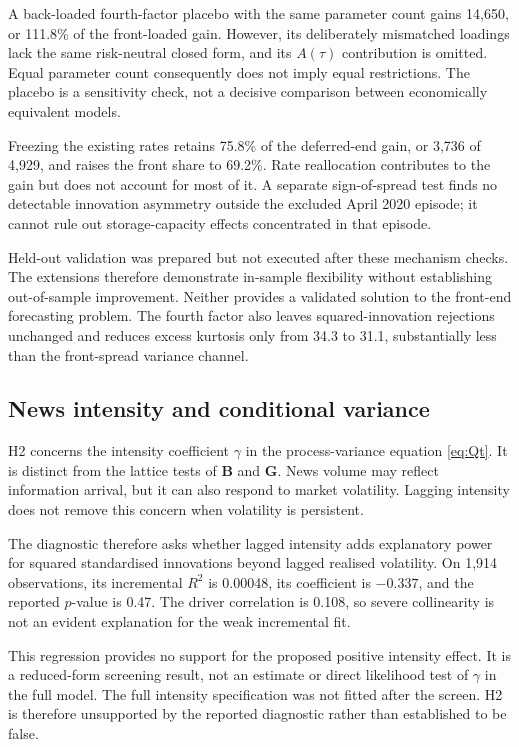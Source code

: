 \documentclass[journal]{IEEEtran}
\begin{document}
A back-loaded fourth-factor placebo with the same parameter count gains 14{,}650, or 111.8\% of the front-loaded gain. However, its deliberately mismatched loadings lack the same risk-neutral closed form, and its $A(\tau)$ contribution is omitted. Equal parameter count consequently does not imply equal restrictions. The placebo is a sensitivity check, not a decisive comparison between economically equivalent models.

Freezing the existing rates retains 75.8\% of the deferred-end gain, or 3{,}736 of 4{,}929, and raises the front share to 69.2\%. Rate reallocation contributes to the gain but does not account for most of it. A separate sign-of-spread test finds no detectable innovation asymmetry outside the excluded April 2020 episode; it cannot rule out storage-capacity effects concentrated in that episode.

Held-out validation was prepared but not executed after these mechanism checks. The extensions therefore demonstrate in-sample flexibility without establishing out-of-sample improvement. Neither provides a validated solution to the front-end forecasting problem. The fourth factor also leaves squared-innovation rejections unchanged and reduces excess kurtosis only from 34.3 to 31.1, substantially less than the front-spread variance channel.

\subsection{News intensity and conditional variance}
\label{sec:h2result}

H2 concerns the intensity coefficient $\gamma$ in the process-variance equation \eqref{eq:Qt}. It is distinct from the lattice tests of $\bm{B}$ and $\bm{G}$. News volume may reflect information arrival, but it can also respond to market volatility. Lagging intensity does not remove this concern when volatility is persistent.

The diagnostic therefore asks whether lagged intensity adds explanatory power for squared standardised innovations beyond lagged realised volatility. On 1{,}914 observations, its incremental $R^2$ is 0.00048, its coefficient is $-0.337$, and the reported $p$-value is 0.47. The driver correlation is 0.108, so severe collinearity is not an evident explanation for the weak incremental fit.

This regression provides no support for the proposed positive intensity effect. It is a reduced-form screening result, not an estimate or direct likelihood test of $\gamma$ in the full model. The full intensity specification was not fitted after the screen. H2 is therefore unsupported by the reported diagnostic rather than established to be false.
\end{document}
